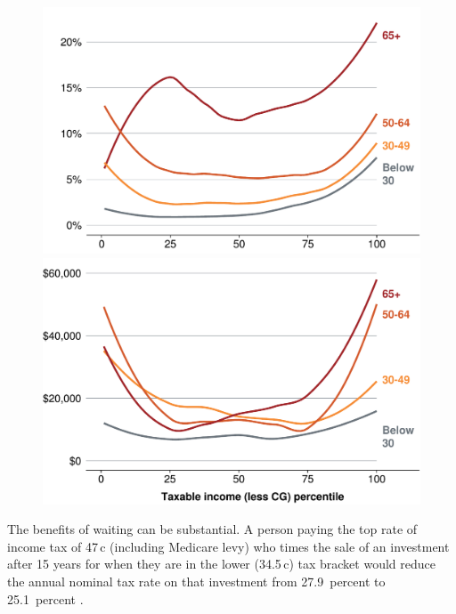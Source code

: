 \documentclass{grattan}\usepackage[]{graphicx}\usepackage[]{color}
\begin{document}
\begin{figure}
\includegraphics[width=\columnwidth]{CGT-NG-atlas//CGT-by-age-income-1}
\includegraphics[width=\columnwidth]{CGT-NG-atlas//CGT-by-age-income-weight-CG-1}
\end{figure}






The benefits of waiting can be substantial. A person paying the top rate of income tax of 47\,c (including Medicare levy) who times the sale of an investment after 15 years for when they are in the lower (34.5\,c) tax bracket would reduce the annual nominal tax rate on that investment from 27.9~percent to 25.1~percent .
\end{document}
